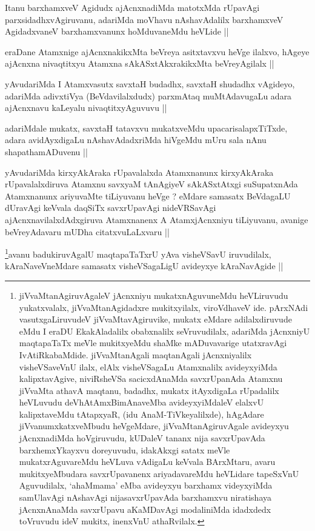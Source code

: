 \begin{artha}
Itanu barxhamxveV Agidudx ajAcnxnadiMda matotxMda rUpavAgi
parxsidadhxvAgiruvanu, adariMda moVhavu nAshavAdalilx barxhamxveV
AgidadxvaneV barxhamxvanunx hoMduvaneMdu heVLide ||
\end{artha}

\begin{artha}
eraDane Atamxnige ajAcnxnakikxMta beVreya asitxtavxvu heVge ilalxvo,
hAgeye ajAcnxna nivaqtitxyu Atamxna sAkASxtAkxrakikxMta beVreyAgilalx ||
\end{artha}

\begin{artha}
yAvudariMda I Atamxvasutx savxtaH budadhx, savxtaH shudadhx vAgideyo,
adariMda adivxtiVya (BeVdavilalxdudx) parxmAtaq muMtAdavugaLu adara
ajAcnxnavu kaLeyalu nivaqtitxyAguvuvu ||
\end{artha}

\begin{artha}
adariMdale mukatx, savxtaH tatavxvu mukatxveMdu upacarisalapxTiTxde,
adara avidAyxdigaLu nAshavAdadxriMda hiVgeMdu mUru sala nAnu
shapathamADuvenu ||
\end{artha}

\begin{artha}
yAvudariMda kirxyAkAraka rUpavalalxda Atamxnanunx kirxyAkAraka
rUpavalalxdiruva Atamxnu savxyaM tAnAgiyeV sAkASxtAtxgi suSupatxnAda
Atamxnanunx ariyuvaMte tiLiyuvanu heVge ? eMdare samasatx BeVdagaLU
dUravAgi keVvala daqSiTx savxrUpavAgi nideVRSavAgi
ajAcnxnavilalxdAdxgiruva Atamxnanenx A AtamxjAcnxniyu tiLiyuvanu,
avanige beVreyAdavaru mUDha citatxvuLaLxvaru ||
\end{artha}

\begin{artha}
\footnote{jiVvaMtanAgiruvAgaleV jAcnxniyu mukatxnAguvuneMdu
  heVLiruvudu yukatxvalalx, jiVvaMtanAgidadxre mukitxyilalx,
  viroVdhaveV ide. pArxNAdi vasutxgaLiruvudeV jiVvaMtavAgiruvike,
  mukatx eMdare adilalxdiruvude eMdu I eraDU EkakAladalilx obabxnalilx
  seVruvudilalx, adariMda jAcnxniyU maqtapaTaTx meVle mukitxyeMdu
  shaMke mADuvavarige utatxravAgi IvAtiRkabaMdide. jiVvaMtanAgali
  maqtanAgali jAcnxniyalilx visheVSaveVnU ilalx, elAlx visheVSagaLu
  Atamxnalilx avideyxyiMda kalipxtavAgive, niviRsheVSa sacicxdAnaMda
  savxrUpanAda Atamxnu jiVvaMta athavA maqtanu, badadhx, mukatx
  itAyxdigaLa rUpadalilx heVLuvudu deVhAtAmxBimAnaveMba
  avideyxyiMdaleV elalxvU kalipxtaveMdu tAtapxyaR, (idu
  AnaM-TiVkeyalilxde), hAgAdare jiVvanumxkatxveMbudu heVgeMdare,
  jiVvaMtanAgiruvAgale avideyxyu jAcnxnadiMda hoVgiruvudu, kUDaleV
  tananx nija savxrUpavAda barxhemxYkayxvu doreyuvudu, idakAkxgi
  satatx meVle mukatxrAguvareMdu heVLuva vAdigaLu keVvala BArxMtaru,
  avaru mukitxyeMbudara savxrUpavanenx ariyadavareMdu heVLidare
  tapeSxVnU Aguvudilalx, `ahaMmama' eMba avideyxyu barxhamx
  videyxyiMda samUlavAgi nAshavAgi nijasavxrUpavAda barxhamxvu
  niratishaya jAcnxnAnaMda savxrUpavu aKaMDavAgi modaliniMda idadxdedx
  toVruvudu ideV mukitx, inenxVnU athaRvilalx.}avanu badukiruvAgalU maqtapaTaTxrU yAva visheVSavU
iruvudilalx, kAraNaveVneMdare samasatx visheVSagaLigU avideyxye
kAraNavAgide ||
\end{artha}

